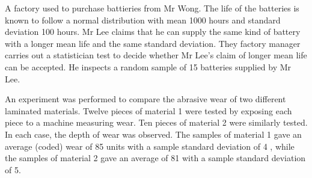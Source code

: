 \documentclass[letterpaper,10pt,addpoints]{exam}
\begin{document}
\begin{questions}
\question[15]
A factory used to purchase battieries from $\mathrm{Mr}$ Wong. The life of the batteries is known to follow a normal distribution with mean 1000 hours and standard deviation 100 hours. Mr Lee claims that he can supply the same kind of battery with a longer mean life and the same standard deviation. They factory manager carries out a statistician test to decide whether Mr Lee's claim of longer mean life can be accepted. He inspects a random sample of 15 batteries supplied by Mr Lee.

\question[15]
An experiment was performed to compare the abrasive wear of two different laminated materials. Twelve pieces of material 1 were tested by exposing each piece to a machine measuring wear. Ten pieces of material 2 were similarly tested. In each case, the depth of wear was observed. The samples of material 1 gave an average (coded) wear of 85 units with a sample standard deviation of 4 , while the samples of material 2 gave an average of 81 with a sample standard deviation of 5. 

\end{questions}
\end{document}
